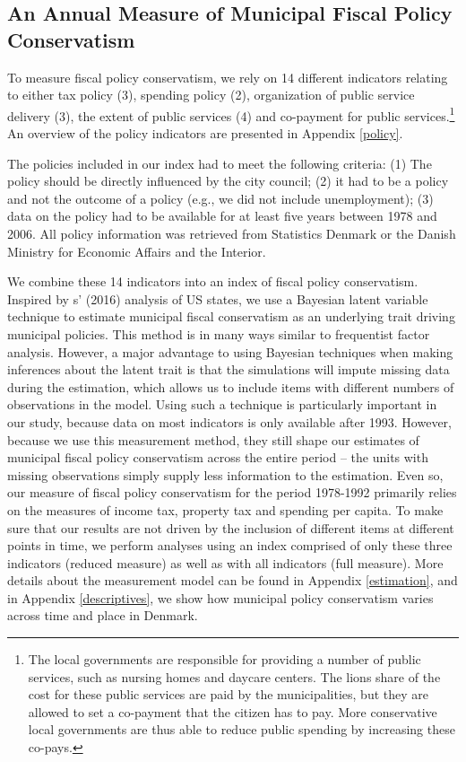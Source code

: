 \documentclass[a4paper,12pt]{article}
\begin{document}
\subsection*{An Annual Measure of Municipal Fiscal Policy Conservatism}

To measure fiscal policy conservatism, we rely on 14 different indicators relating to either tax policy (3), spending policy (2), organization of public service delivery (3), the extent of public services (4) and co-payment for public services.\footnote{The local governments are responsible for providing a number of public services, such as nursing homes and daycare centers. The lions share of the cost for these public services are paid by the municipalities, but they are allowed to set a co-payment that the citizen has to pay. More conservative local governments are thus able to reduce public spending by increasing these co-pays.}  An overview of the policy indicators are presented in Appendix \ref{policy}.

The policies included in our index had to meet the following criteria: (1) The policy should be directly influenced by the city council; (2) it had to be a policy and not the outcome of a policy (e.g., we did not include unemployment); (3) data on the policy had to be available for at least five years between 1978 and 2006. All policy information was retrieved from Statistics Denmark or the Danish Ministry for Economic Affairs and the Interior.

We combine these 14 indicators into an index of fiscal policy conservatism. Inspired by \citeauthor{caughey2016dynamics}s' (2016) analysis of US states, we use a Bayesian latent variable technique to estimate municipal fiscal conservatism as an underlying trait driving municipal policies.  This method is in many ways similar to frequentist factor analysis. However, a major advantage to using Bayesian techniques when making inferences about the latent trait is that the simulations will impute missing data during the estimation, which allows us to include items with different numbers of observations in the model. Using such a technique is particularly important in our study, because data on most indicators is only available after 1993. However, because we use this measurement method, they still shape our estimates of municipal fiscal policy conservatism across the entire period -- the units with missing observations simply supply less information to the estimation. Even so, our measure of fiscal policy conservatism for the period 1978-1992 primarily relies on the measures of income tax, property tax and spending per capita. To make sure that our results are not driven by the inclusion of different items at different points in time, we perform analyses using an index comprised of only these three indicators (reduced measure) as well as with all indicators (full measure). More details about the measurement model can be found in Appendix \ref{estimation}, and in Appendix \ref{descriptives}, we show how municipal policy conservatism varies across time and place in Denmark.
\end{document}
